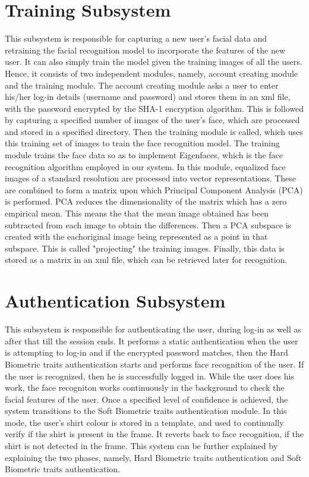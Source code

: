 \documentclass[12pt]{article}			%
\begin{document}
\section {Training Subsystem}
This subsystem is responsible for capturing a new user's facial data and retraining the facial recognition model to incorporate the features of the new user. It can also simply train the model given the training images of all the users. Hence, it consists of two independent modules, namely, account creating module and the training module.
The account creating module asks a user to enter his/her log-in details (username and password) and stores them in an xml file, with the password encrypted by the SHA-1 encryption algorithm. This is followed by capturing a specified number of images of the user's face, which are processed and stored in a specified directory. Then the training module is called, which uses this training set of images to train the face recognition model.
The training module trains the face data so as to implement Eigenfaces, which is the face recognition algorithm employed in our system. In this module, equalized face images of a standard resolution are processed into vector representations. These are combined to form a matrix upon which Principal Component Analysis (PCA) is performed. PCA reduces the dimensionality of the matrix which has a zero empirical mean. This means the that the mean image obtained has been subtracted from each image to obtain the differences. Then a PCA subspace is created with the eachoriginal image being represented as a point in that subspace. This is called "projecting" the training images. Finally, this data is stored as a matrix in an xml file, which can be retrieved later for recognition.
   
\section {Authentication Subsystem}
This subsystem is responsible for authenticating the user, during log-in as well as after that till the session ends. It performs a static authentication when the user is attempting to log-in and if the encrypted password matches, then the Hard Biometric traits authentication starts and performs face recognition of the user. If the user is recognized, then he is successfully logged in. While the user does his work, the face recogniton works continuously in the background to check the facial features of the user. Once a specified level of confidence is achieved, the system transitions to the Soft Biometric traits authentication module. In this mode, the user's shirt colour is stored in a template, and used to continually verify if the shirt is present in the frame. It reverts back to face recognition, if the shirt is not detected in the frame. This system can be further explained by explaining the two phases, namely, Hard Biometric traits authentication and Soft Biometric traits authentication.
 
\end{document}

